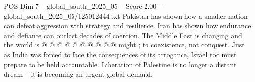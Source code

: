 \begin{textsample}{POS Dim 7 – global\_south\_2025\_05 – Score 2.00 – global\_south\_2025\_05/125012444.txt}
Pakistan has shown how a smaller nation can defeat aggression with strategy and resilience.
Iran has shown how endurance and defiance can outlast decades of coercion.
The Middle East is changing and the world is @ @ @ @ @ @ @ @ @ @ might ; to coexistence, not conquest.
Just as India was forced to face the consequences of its arrogance, Israel too must prepare to be held accountable.
Liberation of Palestine is no longer a distant dream -- it is becoming an urgent global demand.

\end{textsample}
